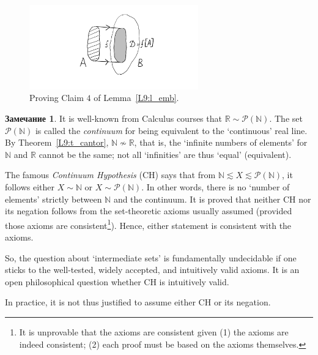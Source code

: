 \documentclass[12pt,notitlepage]{article}
\theoremstyle{plain}
\theoremstyle{definition}
\newtheorem{rem}[thm]{Замечание}
\theoremstyle{plain}
\newcommand{\N}{\mathbb{N}}
\newcommand{\R}{\mathbb{R}}
\newcommand{\mP}{\mathcal{P}}
\newcommand{\1}{\mathbf{1}}
\newcommand{\0}{\mathbf{0}}
\newcommand{\mcomm}[1]{}
\begin{document}
\begin{figure}[h]
	\centering
	\includegraphics*[width=0.65\textwidth]{embed.pdf}
	\caption{Proving Claim $4$ of Lemma~\ref{L9:l_emb}.}
\end{figure}

\mcomm{Clearly, it depends on the calculus course taught which definition of $\R$ they use (if any). An informal discussion of ``infinite binary fractions'' might be helpful here. I recommend to stress the point that there exist non-equivalent infinite sets. Some students manage to ignore this fact even after having studied many mathematical courses.}

\begin{rem}
	It is well-known from Calculus courses that $\R \sim \mP(\N)$. The set $\mP(\N)$ is called the \emph{continuum} for being equivalent to the `continuous' real line. By Theorem~\ref{L9:t_cantor}, $\N \nsim \R$, that is, the `infinite numbers of elements' for $\N$ and $\R$ cannot be the same; not all `infinities' are thus `equal' (equivalent).
	
	The famous \emph{Continuum Hypothesis} (CH) says that from $\N \lesssim X \lesssim \mP(\N)$, it follows either $X \sim \N$ or $X \sim \mP(\N)$. In other words, there is no `number of elements' strictly between $\N$ and the continuum. It is proved that neither CH nor its negation follows from the set-theoretic axioms usually assumed (provided those axioms are consistent\footnote{It is unprovable that the axioms are consistent given (1) the axioms are indeed consistent; (2) each proof must be based on the axioms themselves.}). Hence, either statement is consistent with the axioms.
	
	So, the question about `intermediate sets' is fundamentally undecidable if one sticks to the well-tested, widely accepted, and intuitively valid axioms. It is an open philosophical question whether CH is intuitively valid.  
	
	In practice, it is not thus justified to assume either CH or its negation. 
\end{rem}
\end{document}
